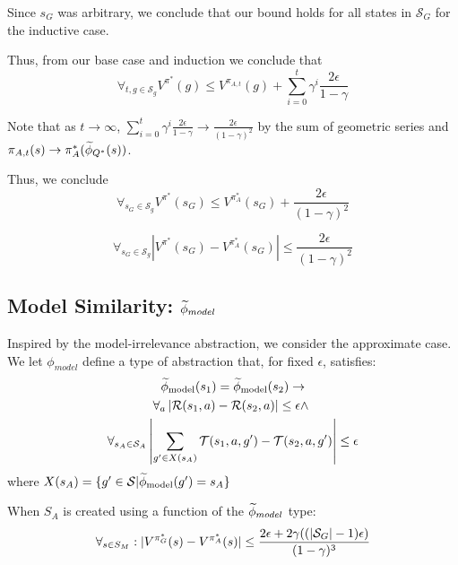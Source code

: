 Since $s_G$ was arbitrary, we conclude that our bound holds for all states in $\mathcal{S}_G$ for the inductive case.

Thus, from our base case and induction we conclude that
\begin{equation}
\forall_{t, g \in \mathcal{S}_g} V^{\pi^*}(g) \leq  V^{\pi_{A,t}}(g) + \sum_{i=0}^{t}\gamma^i \frac{2\epsilon}{1-\gamma}
\end{equation}

Note that as $t \rightarrow \infty$, $\sum_{i=0}^{t}\gamma^i \frac{2\epsilon}{1-\gamma} \rightarrow \frac{2\epsilon}{(1-\gamma)^2}$ by the sum of geometric series and $\pi_{A,t}(s) \rightarrow \pi_A^*(\widetilde \phi_{Q^*}(s))$.

Thus, we conclude
\begin{equation*}
\forall_{s_G \in \mathcal{S}_g} V^{\pi^*}(s_G) \leq  V^{\pi_{A}^*}(s_G) + \frac{2\epsilon}{(1-\gamma)^2}
\end{equation*}

\begin{equation*}
\forall_{s_G \in \mathcal{S}_g} \left | V^{\pi^*}(s_G) - V^{\pi_{A}^*}(s_G) \right | \leq  \frac{2\epsilon}{(1-\gamma)^2}
\end{equation*}



\subsection{Model Similarity: $\widetilde \phi_{model}$}

Inspired by the model-irrelevance abstraction, we consider the approximate case. We let $\phi_{model}$ define a type of abstraction that, for fixed $\epsilon$, satisfies:
\begin{multline}
\widetilde \phi_{\text{model}}(s_1) = \widetilde \phi_{\text{model}}(s_2) \rightarrow \\
\forall_a \left| \mathcal{R}(s_1, a) - \mathcal{R}(s_2, a)\right| \leq \epsilon \wedge\ \\
\forall_{s_A \in \mathcal{S}_A} \left|\sum_{g' \in X(s_A)}\mathcal{T}(s_1, a, g') - \mathcal{T}(s_2, a,g')\right| \leq \epsilon
\end{multline}
where $X(s_A) = \{ g' \in \mathcal{S} | \widetilde \phi_{\text{model}}(g') = s_A \}$



\begin{lma}
\label{lma:model}
When $S_A$ is created using a function of the $\widetilde \phi_{model}$ type:
\begin{equation}
\forall_{s \in S_M} : | V^{\pi^*_G}(s) - V^{\pi^*_{A}}(s) | \leq \frac{2\epsilon + 2\gamma((|\mathcal{S}_G|-1)\epsilon)}{(1-\gamma)^3}
\end{equation}
\end{lma}

